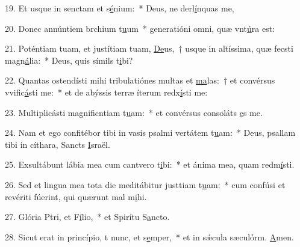 19. Et usque in senctam et s\uline{é}nium:~* Deus, ne derl\uline{í}nquas me,\par 
20. Donec annúntiem brchium t\uline{u}um~* generatióni omni, quæ vnt\uline{ú}ra est:\par 
21. Poténtiam tuam, et justítiam tuam, \uline{De}us,~† usque in altíssima, quæ fecsti magn\uline{á}lia:~* Deus, quis símils t\uline{i}bi?\par 
22. Quantas ostendísti mihi tribulatiónes multas et \uline{ma}las:~† et convérsus vvific\uline{á}sti me:~* et de abýssis terræ íterum redx\uline{í}sti me:\par 
23. Multiplicásti magnificntiam t\uline{u}am:~* et convérsus consoláts \uline{e}s me.\par 
24. Nam et ego confitébor tibi in vasis psalmi vertátem t\uline{u}am:~* Deus, psallam tibi in cíthara, Sancts \uline{I}sraël.\par 
25. Exsultábunt lábia mea cum cantvero t\uline{i}bi:~* et ánima mea, quam redm\uline{í}sti.\par 
26. Sed et lingua mea tota die meditábitur justtiam t\uline{u}am:~* cum confúsi et revériti fúerint, qui quærunt mal m\uline{i}hi.\par 
27. Glória Ptri, et F\uline{í}lio,~* et Spirítu S\uline{a}ncto.\par 
28. Sicut erat in princípio, t nunc, et s\uline{e}mper,~* et in sǽcula sæculórm. \uline{A}men.\par 

